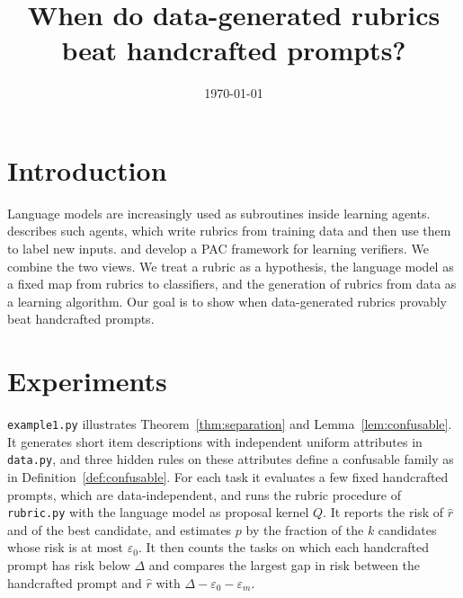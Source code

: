 \documentclass[11pt]{article}
\title{When do data-generated rubrics beat handcrafted prompts?}
\author{}
\date{\today}
\theoremstyle{plain}
\theoremstyle{definition}
\begin{document}
\maketitle

\section{Introduction}\label{sec:intro}

Language models are increasingly used as subroutines inside learning agents.
\citet{mitchell2026talk} describes such agents, which write rubrics from training data and then use them to label new inputs.
\citet{balcan2026talk} and \citet{balcan2025verifiers} develop a PAC framework for learning verifiers.
We combine the two views.
We treat a rubric as a hypothesis, the language model as a fixed map from rubrics to classifiers, and the generation of rubrics from data as a learning algorithm.
Our goal is to show when data-generated rubrics provably beat handcrafted prompts.







\section{Experiments}\label{sec:experiments}

\texttt{example1.py} illustrates Theorem~\ref{thm:separation} and Lemma~\ref{lem:confusable}.
It generates short item descriptions with independent uniform attributes in \texttt{data.py}, and three hidden rules on these attributes define a confusable family as in Definition~\ref{def:confusable}.
For each task it evaluates a few fixed handcrafted prompts, which are data-independent, and runs the rubric procedure of \texttt{rubric.py} with the language model as proposal kernel $Q$.
It reports the risk of $\hat r$ and of the best candidate, and estimates $p$ by the fraction of the $k$ candidates whose risk is at most $\varepsilon_0$.
It then counts the tasks on which each handcrafted prompt has risk below $\Delta$ and compares the largest gap in risk between the handcrafted prompt and $\hat r$ with $\Delta-\varepsilon_0-\varepsilon_m$.
\end{document}
